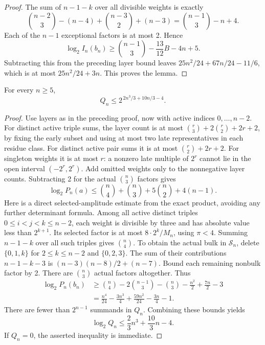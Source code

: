 \begin{proof}
The sum of $n-1-k$ over all divisible weights is exactly
\[
 \binom{n-2}{3}-(n-4)+\binom{n-3}{2}+(n-3)
                  =\binom{n-1}{3}-n+4.
\]
Each of the $n-1$ exceptional factors is at most 2.  Hence
\[
 \log_2 I_n(b_n)\ge
       \binom{n-1}{3}-\frac{13}{12}B-4n+5.
\]
Subtracting this from the preceding layer bound leaves
$25n^2/24+67n/24-11/6$, which is at most
$25n^2/24+3n$.  This proves the lemma.
\end{proof}

\begin{lemma}
For every $n\ge5$,
\[
                  Q_n\le2^{\,2n^3/3+10n/3-4}.
 \tag{PNEW-mass}
\]
\end{lemma}
\begin{proof}
Use layers as in the preceding proof, now with active indices
$0,\ldots,n-2$.  For distinct active triple sums, the layer
count is at most $\binom r3+2\binom r2+2r+2$, by fixing the
early subset and using at most two late representatives in each
residue class.  For distinct active pair sums it is at most
$\binom r2+2r+2$.  For singleton weights it is at most $r$:
a nonzero late multiple of $2^r$ cannot lie in the open interval
$(-2^r,2^r)$.  Add omitted weights only to the nonnegative layer
counts.  Subtracting 2 for the actual $\binom n3$ factors gives
\[
 \log_2P_n(a)\le\binom n4+\binom n3+5\binom n2+4(n-1).
\]
Here is a direct selected-amplitude estimate from the exact product,
avoiding any further determinant formula.  Among all active distinct
triples $0\le i<j<k\le n-2$, each weight is divisible by three and
has absolute value less than $2^{k+1}$.  Its selected factor is at
most $8\cdot2^k/M_n$, using $\pi<4$.  Summing $n-1-k$
over all such triples gives $\binom n4$.  To obtain the actual
bulk in $\mathcal S_n$, delete $\{0,1,k\}$ for $2\le k\le n-2$
and $\{0,2,3\}$.  The sum of their contributions $n-1-k-3$
is $(n-3)(n-8)/2+(n-7)$.  Bound each remaining nonbulk factor
by 2.  There are $\binom n3$ actual factors altogether.  Thus
\[
 \begin{split}
 \log_2P_n(b_n)&\ge
 \binom n4-2\binom{n-1}{3}-\binom n3
                                  -\frac{n^2}{2}+\frac{7n}{2}-3\\
 &=\frac{n^4}{24}-\frac{3n^3}{4}
                        +\frac{59n^2}{24}-\frac{3n}{4}-1.
 \end{split}
 \tag{PNEW-amplitude}
\]
There are fewer than $2^{n-1}$ summands in $Q_n$.  Combining
these bounds yields
\[
                  \log_2Q_n\le\frac23n^3+\frac{10}{3}n-4.
\]
If $Q_n=0$, the asserted inequality is immediate.
\end{proof}

